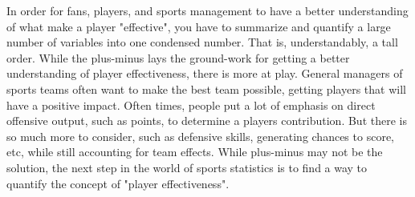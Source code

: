 \documentclass[12pt]{article}
\begin{document}
In order for fans, players, and sports management to have a better understanding of what make a player "effective", you have to 
summarize and quantify a large number of variables into one condensed number. That is, understandably, a tall order. While the plus-minus
lays the ground-work for getting a better understanding of player effectiveness, there is more at play. General managers of sports teams
often want to make the best team possible, getting players that will have a positive impact. Often times, people put a lot of emphasis on
direct offensive output, such as points, to determine a players contribution. But there is so much more to consider, such as defensive skills,
generating chances to score, etc, while still accounting for team effects. While plus-minus may not be the solution, the next step in the 
world of sports statistics is to find a way to quantify the concept of "player effectiveness".



\end{document}
